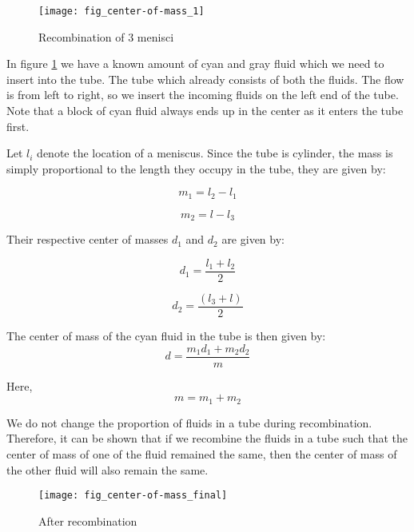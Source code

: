 	\begin{figure}[H]
		\centering
		\texttt{[image: fig\_center-of-mass\_1]}
		\caption{Recombination of 3 menisci}
		\label{fig_center-of-mass_1}
	\end{figure}
	
	In figure \ref{fig_center-of-mass_1} we have a known amount of cyan and gray fluid which we need to insert into the tube. The tube which already consists of both the fluids. The flow is from left to right, so we insert the incoming fluids on the left end of the tube. Note that a block of cyan fluid always ends up in the center as it enters the tube first.
	
	Let $l_{i}$ denote the location of a meniscus. Since the tube is cylinder, the mass is simply proportional to the length they occupy in the tube, they are given by:
	
	\begin{equation}
		m_1 = l_2 - l_1 
	\end{equation}
	
	\begin{equation}
		m_2 = l - l_3
	\end{equation}
	
	Their respective center of masses $d_1$ and $d_2$ are given by:
	
	\begin{equation}	
		d_1 = \frac{l_1 + l_2}{2}
	\end{equation}
	
	\begin{equation}	
		d_2 = \frac{(l_3 + l)}{2}
	\end{equation}
	
	The center of mass of the cyan fluid in the tube is then given by:
	\begin{equation}
		d = \frac{m_1 d_1 + m_2 d_2}{m}
	\end{equation}
	
	Here,
	\begin{equation}
		m = m_1 + m_2
	\end{equation}
	
	
	We do not change the proportion of fluids in a tube during recombination. Therefore, it can be shown that if we recombine the fluids in a tube such that the center of mass of one of the fluid remained the same, then the center of mass of the other fluid will also remain the same.
	
	\begin{figure}[H]
		\centering
		\texttt{[image: fig\_center-of-mass\_final]}
		\caption{After recombination}
	\end{figure}
	
